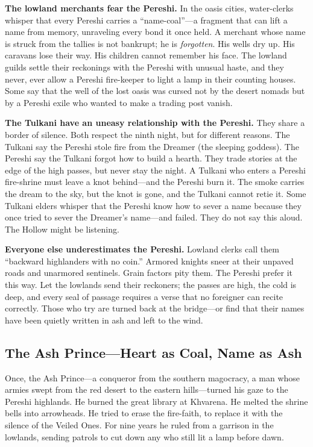 \textbf{The lowland merchants fear the Pereshi.} In the oasis cities, water-clerks whisper that every Pereshi carries a ``name-coal''---a fragment that can lift a name from memory, unraveling every bond it once held. A merchant whose name is struck from the tallies is not bankrupt; he is \textit{forgotten}. His wells dry up. His caravans lose their way. His children cannot remember his face. The lowland guilds settle their reckonings with the Pereshi with unusual haste, and they never, ever allow a Pereshi fire-keeper to light a lamp in their counting houses. Some say that the well of the lost oasis was cursed not by the desert nomads but by a Pereshi exile who wanted to make a trading post vanish.

\textbf{The Tulkani have an uneasy relationship with the Pereshi.} They share a border of silence. Both respect the ninth night, but for different reasons. The Tulkani say the Pereshi stole fire from the Dreamer (the sleeping goddess). The Pereshi say the Tulkani forgot how to build a hearth. They trade stories at the edge of the high passes, but never stay the night. A Tulkani who enters a Pereshi fire-shrine must leave a knot behind---and the Pereshi burn it. The smoke carries the dream to the sky, but the knot is gone, and the Tulkani cannot retie it. Some Tulkani elders whisper that the Pereshi know how to sever a name because they once tried to sever the Dreamer's name---and failed. They do not say this aloud. The Hollow might be listening.

\textbf{Everyone else underestimates the Pereshi.} Lowland clerks call them ``backward highlanders with no coin.'' Armored knights sneer at their unpaved roads and unarmored sentinels. Grain factors pity them. The Pereshi prefer it this way. Let the lowlands send their reckoners; the passes are high, the cold is deep, and every seal of passage requires a verse that no foreigner can recite correctly. Those who try are turned back at the bridge---or find that their names have been quietly written in ash and left to the wind.

\subsection*{The Ash Prince---Heart as Coal, Name as Ash}
\label{subsec:pereshi-forgotten-prince}

Once, the Ash Prince---a conqueror from the southern magocracy, a man whose armies swept from the red desert to the eastern hills---turned his gaze to the Pereshi highlands. He burned the great library at Khvarena. He melted the shrine bells into arrowheads. He tried to erase the fire-faith, to replace it with the silence of the Veiled Ones. For nine years he ruled from a garrison in the lowlands, sending patrols to cut down any who still lit a lamp before dawn.


